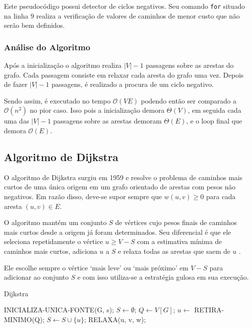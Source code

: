 \documentclass[12pt]{article}
\begin{document}
Este pseudocódigo possui detector de ciclos negativos. Seu comando \texttt{for} situado na linha 9 realiza a verificação de valores de caminhos de menor custo que não serão bem definidos.


\subsubsection{Análise do Algoritmo}

Após a inicialização o algoritmo realiza $|V| - 1$ passagens sobre as arestas do grafo. Cada passagem consiste em relaxar cada aresta do grafo uma vez. Depois de fazer $|V| - 1$ passagens, é realizado a procura de um ciclo negativo.

Sendo assim, é executado no tempo $\mathcal{O}(VE)$ podendo então ser comparado a $\mathcal{O}(n^2)$ no pior caso. Isso pois a inicialização demora $\Theta(V)$, em seguida cada uma das $|V| - 1$ passagens sobre as arestas demoram $\Theta(E)$, e o loop final que demora $\mathcal{O}(E)$.

\subsection{Algoritmo de Dijkstra} \label{sec:firstpage}

O algoritmo de Dijkstra surgiu em 1959 e resolve o problema de caminhos mais curtos de uma única origem em um grafo orientado de arestas com pesos não negativos. Em razão disso, deve-se supor sempre que $w(u, v) \geq 0$ para cada aresta $(u,v) \in E$.

O algoritmo mantém um conjunto $S$ de vértices cujo pesos finais de caminhos mais curtos desde a origem já foram determinados. Seu diferencial é que ele seleciona repetidamente o vértice $u \geq V - S$ com a estimativa mínima de caminhos mais curtos, adiciona $u$ a $S$ e relaxa todas as arestas que saem de $u$ \cite{cormen2002algoritmos}.

Ele escolhe sempre o vértice `mais leve' ou `mais próximo' em $V - S$ para adicionar ao conjunto $S$ e com isso utiliza-se a estratégia gulosa em sua execução.

\begin{algorithm}[H]
\caption{Dijkstra}\label{alg:d}
\begin{algorithmic}[1]
	\State INICIALIZA-UNICA-FONTE(G, s);
   \State $S\gets \emptyset$;
   \State $Q\gets V[G]$;
      \State $u\gets$ RETIRA-MINIMO(Q);
      \State $S\gets S \cup \{u\}$;
	      \State RELAXA(u, v, w);
      \EndFor
   \EndWhile\label{euclidendwhile}
\EndProcedure
\end{algorithmic}
\end{algorithm}
\end{document}
